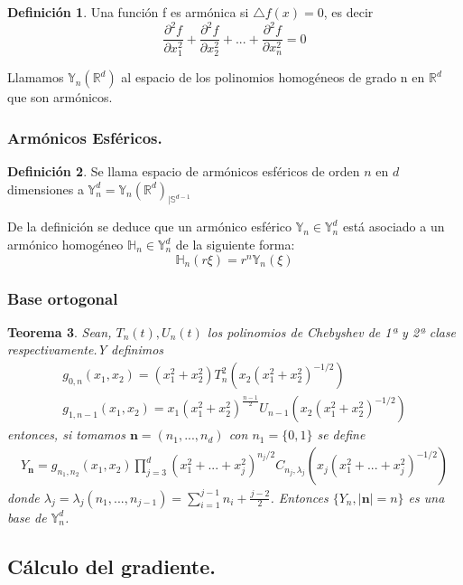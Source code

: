 \documentclass{beamer}
\theoremstyle{plain}
\newtheorem{thm}{Teorema}
\theoremstyle{definition}
\newtheorem{defn}[thm]{Definici\'{o}n}
\theoremstyle{plain}
\theoremstyle{definition}
\theoremstyle{remark}
\theoremstyle{definition}
\begin{document}
\begin{frame}
	\begin{defn}
		Una función f es armónica si $\triangle f (x) = 0$, es decir $$\frac{\partial^2 f}{\partial x_1^2}+\frac{\partial^2 f}{\partial x_2^2}+...+\frac{\partial^2 f}{\partial x_n^2} = 0$$
	\end{defn}

	Llamamos $\mathds{Y}_n(\mathds{R}^d)$ al espacio de los polinomios homogéneos de grado n en $\mathds{R}^d$ que son armónicos.

\end{frame}
\begin{frame}
	\frametitle{Armónicos Esféricos.}
	\begin{defn}
		Se llama espacio de armónicos esféricos de orden $n$ en $d$ dimensiones a	$\mathds{Y}^d_n = \mathds{Y}_n(\mathds{R}^d)_{|\mathds{S}^{d-1}}$ 
	\end{defn}
	De la definición se deduce que un armónico esférico $\mathds{Y}_n \in \mathds{Y}^d_n$ está asociado a un armónico homogéneo $\mathds{H}_n \in \mathds{Y}^d_n$ de la siguiente forma:
	$$
	\mathds{H}_n(r\xi) = r^n\mathds{Y}_n(\xi)
	$$
\end{frame}
\begin{frame}
	\frametitle{Base ortogonal}
	\begin{thm}
		Sean, $T_{n}(t),U_{n}(t)$ los polinomios de Chebyshev de 1ª y 2ª clase respectivamente.Y definimos
		\begin{gather*}
		g_{0,n}(x_1,x_2) = (x_1^2+x_2^2)T_n^2(x_2(x_1^2+x_2^2)^{-1/2})
		\\
		g_{1,n-1}(x_1,x_2) = x_1(x_1^2+x_2^2)^{\frac{n-1}{2}}U_{n-1}(x_2(x_1^2+x_2^2)^{-1/2})
		\end{gather*}
		entonces, si tomamos $\textbf{n}=(n_1,...,n_d)$ con $n_1 = \{0,1\}$ se define
		\begin{gather*}
		Y_{\textbf{n}}=g_{n_1,n_2}(x_1,x_2)\prod_{j=3}^{d}(x_1^2+...+x_j^2)^{n_j/2}C_{n_j,\lambda_j}(x_j(x_1^2+...+x_j^2)^{-1/2})
		\end{gather*}
		donde $\lambda_j =\lambda_j(n_1,...,n_{j-1}) = \sum_{i=1}^{j-1}n_i + \frac{j-2}{2}$. Entonces $\{Y_n,|\textbf{n}|=n\}$ es una base de $\mathds{Y}_{n}^{d}$.
	\end{thm}
\end{frame}
\subsection{Cálculo del gradiente.}
\begin{frame}
	\tableofcontents[currentsection,currentsubsection,sections=1]
\end{frame}
\end{document}
